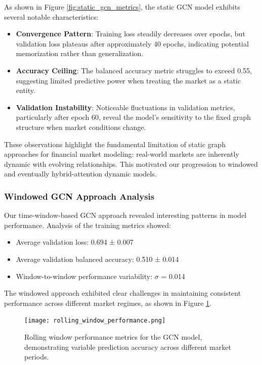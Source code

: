 \documentclass[12pt]{article}
\begin{document}
As shown in Figure \ref{fig:static_gcn_metrics}, the static GCN model exhibits several notable characteristics:

\begin{itemize}
    \item \textbf{Convergence Pattern}: Training loss steadily decreases over epochs, but validation loss plateaus after approximately 40 epochs, indicating potential memorization rather than generalization.
    \item \textbf{Accuracy Ceiling}: The balanced accuracy metric struggles to exceed 0.55, suggesting limited predictive power when treating the market as a static entity.
    \item \textbf{Validation Instability}: Noticeable fluctuations in validation metrics, particularly after epoch 60, reveal the model's sensitivity to the fixed graph structure when market conditions change.
\end{itemize}

These observations highlight the fundamental limitation of static graph approaches for financial market modeling: real-world markets are inherently dynamic with evolving relationships. This motivated our progression to windowed and eventually hybrid-attention dynamic models.

\subsubsection{Windowed GCN Approach Analysis}

Our time-window-based GCN approach revealed interesting patterns in model performance. Analysis of the training metrics showed:

\begin{itemize}
    \item Average validation loss: 0.694 ± 0.007
    \item Average validation balanced accuracy: 0.510 ± 0.014
    \item Window-to-window performance variability: $\sigma$ = 0.014
\end{itemize}

The windowed approach exhibited clear challenges in maintaining consistent performance across different market regimes, as shown in Figure \ref{fig:rolling_performance}.

\begin{figure}[h]
    \centering
    \texttt{[image: rolling\_window\_performance.png]}
    \caption{Rolling window performance metrics for the GCN model, demonstrating variable prediction accuracy across different market periods.}
    \label{fig:rolling_performance}
\end{figure}
\end{document}
